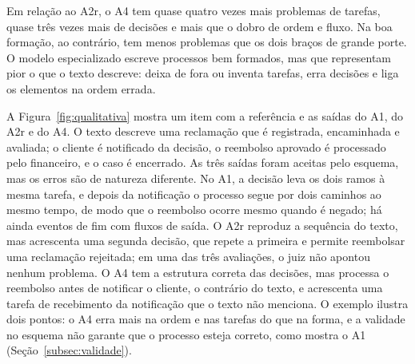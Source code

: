 \begin{table}[htb]
\end{table}

Em relação ao A2r, o A4 tem quase quatro vezes mais problemas de tarefas, quase três vezes mais de decisões e mais que o dobro de ordem e fluxo. Na boa formação, ao contrário, tem menos problemas que os dois braços de grande porte. O modelo especializado escreve processos bem formados, mas que representam pior o que o texto descreve: deixa de fora ou inventa tarefas, erra decisões e liga os elementos na ordem errada.

A Figura~\ref{fig:qualitativa} mostra um item com a referência e as saídas do A1, do A2r e do A4. O texto descreve uma reclamação que é registrada, encaminhada e avaliada; o cliente é notificado da decisão, o reembolso aprovado é processado pelo financeiro, e o caso é encerrado. As três saídas foram aceitas pelo esquema, mas os erros são de natureza diferente. No A1, a decisão leva os dois ramos à mesma tarefa, e depois da notificação o processo segue por dois caminhos ao mesmo tempo, de modo que o reembolso ocorre mesmo quando é negado; há ainda eventos de fim com fluxos de saída. O A2r reproduz a sequência do texto, mas acrescenta uma segunda decisão, que repete a primeira e permite reembolsar uma reclamação rejeitada; em uma das três avaliações, o juiz não apontou nenhum problema. O A4 tem a estrutura correta das decisões, mas processa o reembolso antes de notificar o cliente, o contrário do texto, e acrescenta uma tarefa de recebimento da notificação que o texto não menciona. O exemplo ilustra dois pontos: o A4 erra mais na ordem e nas tarefas do que na forma, e a validade no esquema não garante que o processo esteja correto, como mostra o A1 (Seção~\ref{subsec:validade}).

